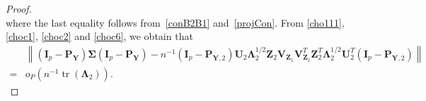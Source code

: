 \documentclass[12pt]{article} %
\DeclareMathOperator{\mytr}{tr}
\newcommand{\bZ}{\mathbf{Z}}
\newcommand{\bP}{\mathbf{P}}
\newcommand{\bY}{\mathbf{Y}}
\newcommand{\bI}{\mathbf{I}}
\newcommand{\bU}{\mathbf{U}}
\newcommand{\bV}{\mathbf{V}}
\newcommand{\bfsym}[1]{\ensuremath{\boldsymbol{#1}}}
\def\bLambda {\bfsym {\Lambda}}
\def\bSigma {\bfsym {\Sigma}}
\theoremstyle{definition}
\begin{document}
\begin{appendices}
\begin{proof}
\begin{equation}
 \end{equation}
where the last equality follows from~\eqref{conB2B1} and~\eqref{projCon}.
From \eqref{cho111}, \eqref{choc1}, \eqref{choc2} and \eqref{choc6}, we obtain that
         \begin{equation*}
             \begin{split}
             &\left\|
             (\bI_p -\bP_\bY)\bSigma (\bI_p- \bP_{\bY})
             -
             n^{-1}
             (\bI_p -\bP_{\bY,2})
              \bU_2 \bLambda_2^{1/2} \bZ_2 \bV_{\bZ_1} \bV_{\bZ_1}^T \bZ_2^T \bLambda_2^{1/2} \bU_2^T
             (\bI_p- \bP_{\bY,2})
             \right\|
             \\
             =&
             o_P\left(n^{-1}\mytr(\bLambda_2)\right).
             \end{split}
         \end{equation*}


\end{proof}
\end{appendices}
\end{document}
